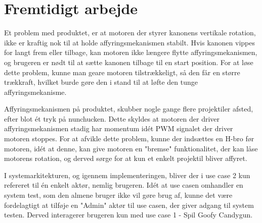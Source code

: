 \chapter{Fremtidigt arbejde}




Et problem med produktet, er at motoren der styrer kanonens vertikale rotation, ikke er kraftig nok til at holde affyringsmekanismen stabilt. Hvis kanonen vippes for langt frem eller tilbage, kan motoren ikke længere flytte affyringsmekanismen, og brugeren er nødt til at sætte kanonen tilbage til en start position. For at løse dette problem, kunne man geare motoren tilstrækkeligt, så den får en større trækkraft, hvilket burde gøre den i stand til at løfte den tunge affyringsmekanisme.

Affyringsmekanismen på produktet, skubber nogle gange flere projektiler afsted, efter blot ét tryk på nunchucken. Dette skyldes at motoren der driver affyringsmekanismen stadig har momentum idét PWM signalet der driver motoren stoppes. For at afvikle dette problem, kunne der indsættes en H-bro før motoren, idét at denne, kan give motoren en "bremse" funktionalitet, der kan låse motorens rotation, og derved sørge for at kun et enkelt projektil bliver affyret.  

I systemarkitekturen, og igennem implementeringen, bliver der i use case 2 kun refereret til én enkelt aktør, nemlig brugeren. Idét at use casen omhandler en system test, som den almene bruger ikke vil gøre brug af, kunne det være fordelagtigt at tilføje en "Admin" aktør til use casen, der giver adgang til system testen. Derved interagerer brugeren kun med use case 1 - Spil Goofy Candygun.

